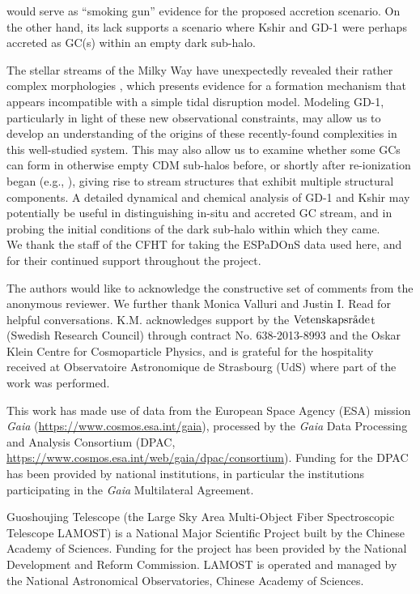 \documentclass[apj]{emulateapj}
\begin{document}
would serve as ``smoking gun'' evidence for the proposed accretion scenario. On the other hand, its lack supports a scenario where Kshir and GD-1 were perhaps accreted as GC(s) within an empty dark sub-halo.



The stellar streams of the Milky Way have unexpectedly revealed their rather complex morphologies \citep{WhelanBonacaGD12018, MalhanCocoonDetection2019, Bonaca2019Jhelum}, which presents evidence for a formation mechanism that appears incompatible with a simple tidal disruption model. Modeling GD-1, particularly in light of these new observational constraints, may allow us to develop an understanding of the origins of these recently-found complexities in this well-studied system. This may also allow us to examine whether some GCs can form in otherwise empty CDM sub-halos before, or shortly after re-ionization began (e.g., \citealt{Peebles1984, Mashchenko2005, Ricotti2016}), giving rise to stream structures that exhibit multiple structural components. A detailed dynamical and chemical analysis of GD-1 and Kshir may potentially be useful in distinguishing in-situ and accreted GC stream, and in probing the initial conditions of the dark sub-halo within which they came. \\
 
We thank the staff of the CFHT for taking the ESPaDOnS data used here, and for their continued support throughout the project. 

The authors would like to acknowledge the constructive set of comments from the anonymous reviewer. We further thank Monica Valluri and Justin I. Read for helpful conversations. K.M. acknowledges  support  by the $\rm{Vetenskapsr\mathring{a}de}$t (Swedish Research Council) through contract No.  638-2013-8993 and the Oskar Klein Centre for Cosmoparticle Physics, and is grateful for the hospitality received at Observatoire Astronomique de Strasbourg (UdS) where part of the work was performed.

This work has made use of data from the European Space Agency (ESA) mission {\it Gaia} (\url{https://www.cosmos.esa.int/gaia}), processed by the {\it Gaia} Data Processing and Analysis Consortium (DPAC, \url{https://www.cosmos.esa.int/web/gaia/dpac/consortium}). Funding for the DPAC has been provided by national institutions, in particular the institutions participating in the {\it Gaia} Multilateral Agreement. 

Guoshoujing Telescope (the Large Sky Area Multi-Object Fiber Spectroscopic Telescope LAMOST) is a National Major Scientific Project built by the Chinese Academy of Sciences. Funding for the project has been provided by the National Development and Reform Commission. LAMOST is operated and managed by the National Astronomical Observatories, Chinese Academy of Sciences. 
\end{document}
